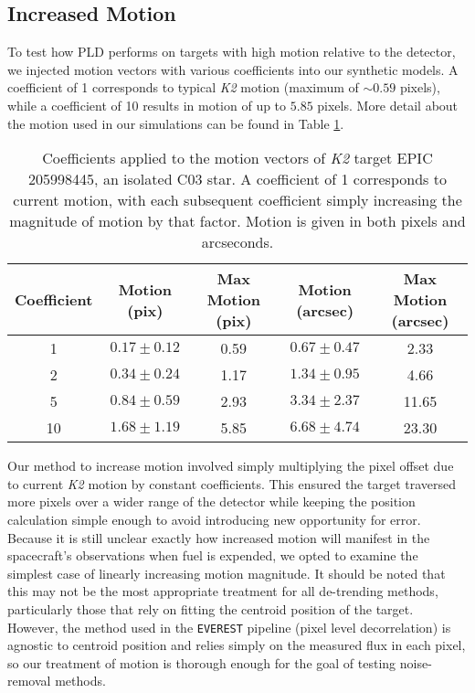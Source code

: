 \documentclass[12pt,preprint]{aastex}
\begin{document}
\subsection{Increased Motion}

To test how PLD performs on targets with high motion relative to the detector, we injected motion vectors with various coefficients into our synthetic models. A coefficient of 1 corresponds to typical \textit{K2} motion (maximum of $\sim 0.59$ pixels), while a coefficient of 10 results in motion of up to $5.85$ pixels. More detail about the motion used in our simulations can be found in Table \ref{table:motionstatistics}.

\begin{table}[h!]
\begin{center}
    \begin{tabular}{c | c | c | c | c}
        Coefficient & Motion (pix) & Max Motion (pix) & Motion (arcsec) & Max Motion (arcsec) \\
        \hline \hline
        1 & $0.17\pm0.12$ & 0.59 & $0.67\pm0.47$ & 2.33 \\
        2 & $0.34\pm0.24$ & 1.17 & $1.34\pm0.95$ & 4.66 \\
				5 & $0.84\pm0.59$ & 2.93 & $3.34\pm2.37$ & 11.65 \\
				10 & $1.68\pm1.19$ & 5.85 & $6.68\pm4.74$ & 23.30 \\
   \end{tabular}
	 \caption{Coefficients applied to the motion vectors of \textit{K2} target EPIC 205998445, an isolated C03 star. A coefficient of 1 corresponds to current motion, with each subsequent coefficient simply increasing the magnitude of motion by that factor. Motion is given in both pixels and arcseconds.}
	 \label{table:motionstatistics}
\end{center}
\end{table}

Our method to increase motion involved simply multiplying the pixel offset due to current \textit{K2} motion by constant coefficients. This ensured the target traversed more pixels over a wider range of the detector while keeping the position calculation simple enough to avoid introducing new opportunity for error. Because it is still unclear exactly how increased motion will manifest in the spacecraft's observations when fuel is expended, we opted to examine the simplest case of linearly increasing motion magnitude. It should be noted that this may not be the most appropriate treatment for all de-trending methods, particularly those that rely on fitting the centroid position of the target. However, the method used in the \texttt{EVEREST} pipeline (pixel level decorrelation) is agnostic to centroid position and relies simply on the measured flux in each pixel, so our treatment of motion is thorough enough for the goal of testing noise-removal methods.
\end{document}
